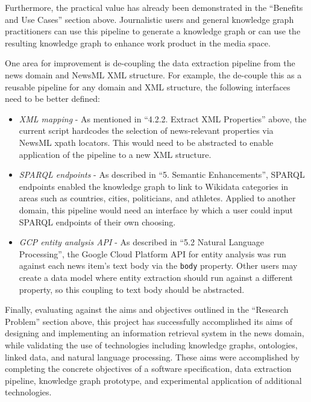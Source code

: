 \documentclass[11pt]{article}
\begin{document}

  Furthermore, the practical value has already been demonstrated in the ``Benefits and Use Cases'' section above. Journalistic users and general knowledge graph practitioners can use this pipeline to generate a knowledge graph or can use the resulting knowledge graph to enhance work product in the media space.

  One area for improvement is de-coupling the data extraction pipeline from the news domain and NewsML XML structure. For example, the de-couple this as a reusable pipeline for any domain and XML structure, the following interfaces need to be better defined:
  \begin{itemize}
    \item{\textit{XML mapping} - As mentioned in ``4.2.2. Extract XML Properties'' above, the current script hardcodes the selection of news-relevant properties via NewsML xpath locators. This would need to be abstracted to enable application of the pipeline to a new XML structure.}
    \item{\textit{SPARQL endpoints} - As described in ``5. Semantic Enhancements'', SPARQL endpoints enabled the knowledge graph to link to Wikidata categories in areas such as countries, cities, politicians, and athletes. Applied to another domain, this pipeline would need an interface by which a user could input SPARQL endpoints of their own choosing.}
    \item{\textit{GCP entity analysis API} - As described in ``5.2 Natural Language Processing'', the Google Cloud Platform API for entity analysis was run against each news item's text body via the \lstinline{body} property. Other users may create a data model where entity extraction should run against a different property, so this coupling to text body should be abstracted.}
  \end{itemize}

  Finally, evaluating against the aims and objectives outlined in the ``Research Problem'' section above, this project has successfully accomplished its aims of designing and implementing an information retrieval system in the news domain, while validating the use of technologies including knowledge graphs, ontologies, linked data, and natural language processing. These aims were accomplished by completing the concrete objectives of a software specification, data extraction pipeline, knowledge graph prototype, and experimental application of additional technologies.
\end{document}
